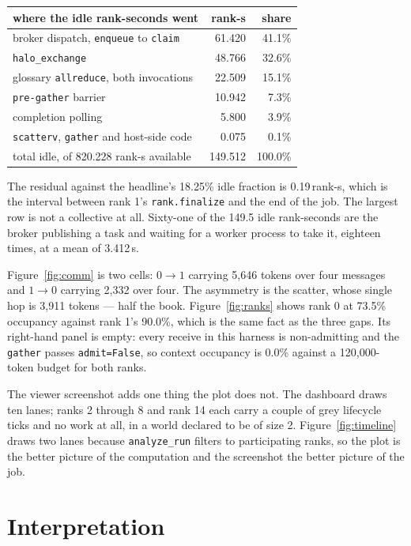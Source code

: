 \documentclass[11pt]{article}
\begin{document}
\begin{center}
\begin{tabular}{@{}lrr@{}}
\toprule
  where the idle rank-seconds went & rank-s & share \\
\midrule
  broker dispatch, \texttt{enqueue} to \texttt{claim} & 61.420 & 41.1\% \\
  \texttt{halo\_exchange} & 48.766 & 32.6\% \\
  glossary \texttt{allreduce}, both invocations & 22.509 & 15.1\% \\
  \texttt{pre-gather} barrier & 10.942 & 7.3\% \\
  completion polling & 5.800 & 3.9\% \\
  \texttt{scatterv}, \texttt{gather} and host-side code & 0.075 & 0.1\% \\
\midrule
  total idle, of 820.228 rank-s available & 149.512 & 100.0\% \\
\bottomrule
\end{tabular}
\end{center}

The residual against the headline's 18.25\% idle fraction is 0.19\,rank-s, which is the interval
between rank 1's \texttt{rank.finalize} and the end of the job. The largest row is not a
collective at all. Sixty-one of the 149.5 idle rank-seconds are the broker publishing a task and
waiting for a worker process to take it, eighteen times, at a mean of 3.412\,s.

Figure~\ref{fig:comm} is two cells: $0\to1$ carrying 5{,}646 tokens over four messages and
$1\to0$ carrying 2{,}332 over four. The asymmetry is the scatter, whose single hop is 3{,}911
tokens --- half the book. Figure~\ref{fig:ranks} shows rank 0 at 73.5\% occupancy against rank 1's
90.0\%, which is the same fact as the three gaps. Its right-hand panel is empty: every receive in
this harness is non-admitting and the \texttt{gather} passes \texttt{admit=False}, so context
occupancy is 0.0\% against a 120{,}000-token budget for both ranks.

The viewer screenshot adds one thing the plot does not. The dashboard draws ten lanes; ranks 2
through 8 and rank 14 each carry a couple of grey lifecycle ticks and no work at all, in a world
declared to be of size 2. Figure~\ref{fig:timeline} draws two lanes because \texttt{analyze\_run}
filters to participating ranks, so the plot is the better picture of the computation and the
screenshot the better picture of the job.

\section{Interpretation}
\end{document}
